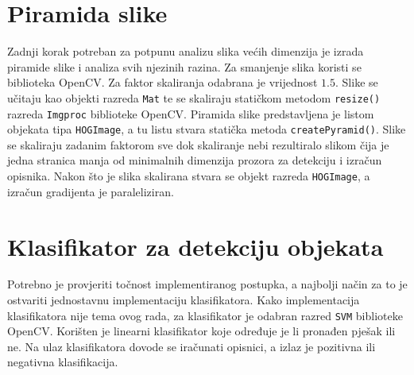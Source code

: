 \documentclass[times, utf8, zavrsni]{fer}
\begin{document}
\section{Piramida slike}
Zadnji korak potreban za potpunu analizu slika većih dimenzija je izrada piramide slike i analiza svih njezinih razina. Za smanjenje slika koristi se biblioteka OpenCV. Za faktor skaliranja odabrana je vrijednost \(1.5\). Slike se učitaju kao objekti razreda \verb|Mat| te se skaliraju statičkom metodom \verb|resize()| razreda \verb|Imgproc| biblioteke OpenCV. Piramida slike predstavljena je listom objekata tipa \verb|HOGImage|, a tu listu stvara statička metoda \verb|createPyramid()|. Slike se skaliraju zadanim faktorom sve dok skaliranje nebi rezultiralo slikom čija je jedna stranica manja od minimalnih dimenzija prozora za detekciju i izračun opisnika. Nakon što je slika skalirana stvara se objekt razreda \verb|HOGImage|, a izračun gradijenta je paraleliziran.

\section{Klasifikator za detekciju objekata}
Potrebno je provjeriti točnost implementiranog postupka, a najbolji način za to je ostvariti jednostavnu implementaciju klasifikatora. Kako implementacija klasifikatora nije tema ovog rada, za klasifikator je odabran razred \verb|SVM| biblioteke OpenCV. Korišten je linearni klasifikator koje određuje je li pronađen pješak ili ne. Na ulaz klasifikatora dovode se iračunati opisnici, a izlaz je pozitivna ili negativna klasifikacija.
\end{document}
